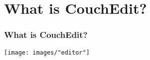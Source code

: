 \section{What is CouchEdit?}

\begin{frame}
  \frametitle{What is CouchEdit?}
  \hspace{-1cm}
  \texttt{[image: images/"editor"]}
\end{frame}






